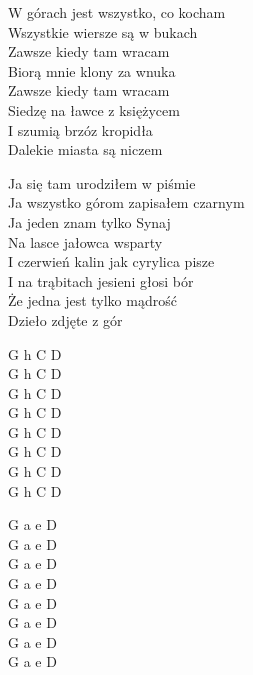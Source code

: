 \begin{text}
    W górach jest wszystko, co kocham\\
    Wszystkie wiersze są w bukach\\
    Zawsze kiedy tam wracam\\
    Biorą mnie klony za wnuka\\
    Zawsze kiedy tam wracam\\
    Siedzę na ławce z księżycem\\
    I szumią brzóz kropidła\\
    Dalekie miasta są niczem

    Ja się tam urodziłem w piśmie\\
    Ja wszystko górom zapisałem czarnym\\
    Ja jeden znam tylko Synaj\\
    Na lasce jałowca wsparty\\
    I czerwień kalin jak cyrylica pisze\\
    I na trąbitach jesieni głosi bór\\
    Że jedna jest tylko mądrość\\
    Dzieło zdjęte z gór
\end{text}
\begin{chord}
    G h C D\\
    G h C D\\
    G h C D\\
    G h C D\\
    G h C D\\
    G h C D\\
    G h C D\\
    G h C D

    G a e D\\
    G a e D\\
    G a e D\\
    G a e D\\
    G a e D\\
    G a e D\\
    G a e D\\
    G a e D
\end{chord}